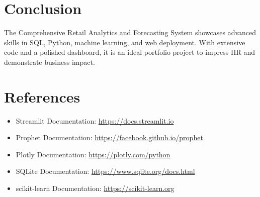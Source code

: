 \documentclass[12pt]{article}
\begin{document}
\section{Conclusion}
The Comprehensive Retail Analytics and Forecasting System showcases advanced skills in SQL, Python, machine learning, and web deployment. With extensive code and a polished dashboard, it is an ideal portfolio project to impress HR and demonstrate business impact.

\section{References}
\begin{itemize}
    \item Streamlit Documentation: \url{https://docs.streamlit.io}
    \item Prophet Documentation: \url{https://facebook.github.io/prophet}
    \item Plotly Documentation: \url{https://plotly.com/python}
    \item SQLite Documentation: \url{https://www.sqlite.org/docs.html}
    \item scikit-learn Documentation: \url{https://scikit-learn.org}
\end{itemize}
\end{document}
